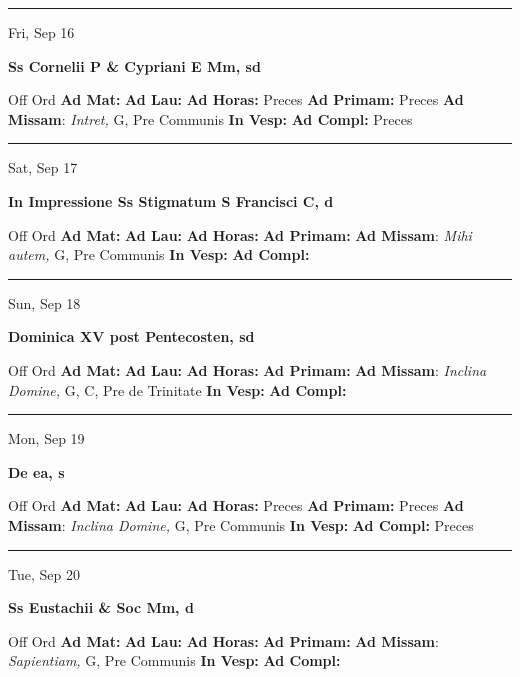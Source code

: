 \documentclass[letterpaper, 10pt]{article}
\begin{document}
\hrule
\begin{center}
Fri, Sep 16
\end{center}\textbf{ \large Ss Cornelii P \& Cypriani E Mm, \textnormal{\normalsize sd}}
\begin{justify}
Off Ord
\textbf{Ad Mat: }
\textbf{Ad Lau: }
\textbf{Ad Horas: }Preces
\textbf{Ad Primam: }Preces
\textbf{Ad Missam}: \textit{Intret,} G, Pre Communis
\textbf{In Vesp: }
\textbf{Ad Compl: }Preces\end{justify}



\hrule
\begin{center}
Sat, Sep 17
\end{center}\textbf{ \large In Impressione Ss Stigmatum S Francisci C, \textnormal{\normalsize d}}
\begin{justify}
Off Ord
\textbf{Ad Mat: }
\textbf{Ad Lau: }
\textbf{Ad Horas: }
\textbf{Ad Primam: }
\textbf{Ad Missam}: \textit{Mihi autem,} G, Pre Communis
\textbf{In Vesp: }
\textbf{Ad Compl: }\end{justify}



\hrule
\begin{center}
Sun, Sep 18
\end{center}\textbf{ \large Dominica XV post Pentecosten, \textnormal{\normalsize sd}}
\begin{justify}
Off Ord
\textbf{Ad Mat: }
\textbf{Ad Lau: }
\textbf{Ad Horas: }
\textbf{Ad Primam: }
\textbf{Ad Missam}: \textit{Inclina Domine,} G, C, Pre de Trinitate
\textbf{In Vesp: }
\textbf{Ad Compl: }\end{justify}



\hrule
\begin{center}
Mon, Sep 19
\end{center}\textbf{ \large De ea, \textnormal{\normalsize s}}
\begin{justify}
Off Ord
\textbf{Ad Mat: }
\textbf{Ad Lau: }
\textbf{Ad Horas: }Preces
\textbf{Ad Primam: }Preces
\textbf{Ad Missam}: \textit{Inclina Domine,} G, Pre Communis
\textbf{In Vesp: }
\textbf{Ad Compl: }Preces\end{justify}



\hrule
\begin{center}
Tue, Sep 20
\end{center}\textbf{ \large Ss Eustachii \& Soc Mm, \textnormal{\normalsize d}}
\begin{justify}
Off Ord
\textbf{Ad Mat: }
\textbf{Ad Lau: }
\textbf{Ad Horas: }
\textbf{Ad Primam: }
\textbf{Ad Missam}: \textit{Sapientiam,} G, Pre Communis
\textbf{In Vesp: }
\textbf{Ad Compl: }\end{justify}
\end{document}
